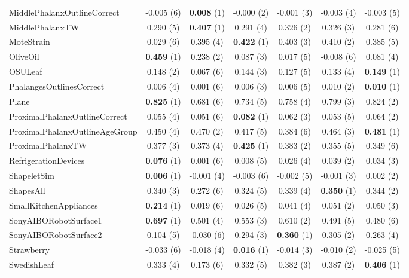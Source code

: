 \begin{table}[ht]
\begin{adjustbox}{width=\textwidth}
\begin{tabular}{lcccccc}
    MiddlePhalanxOutlineCorrect & -0.005 (6) & \textbf{0.008} (1) & -0.000 (2) & -0.001 (3) & -0.003 (4) & -0.003 (5) \\
    MiddlePhalanxTW & 0.290 (5) & \textbf{0.407} (1) & 0.291 (4) & 0.326 (2) & 0.326 (3) & 0.281 (6) \\
    MoteStrain & 0.029 (6) & 0.395 (4) & \textbf{0.422} (1) & 0.403 (3) & 0.410 (2) & 0.385 (5) \\
    OliveOil & \textbf{0.459} (1) & 0.238 (2) & 0.087 (3) & 0.017 (5) & -0.008 (6) & 0.081 (4) \\
    OSULeaf & 0.148 (2) & 0.067 (6) & 0.144 (3) & 0.127 (5) & 0.133 (4) & \textbf{0.149} (1) \\
    PhalangesOutlinesCorrect & 0.006 (4) & 0.001 (6) & 0.006 (3) & 0.006 (5) & 0.010 (2) & \textbf{0.010} (1) \\
    Plane & \textbf{0.825} (1) & 0.681 (6) & 0.734 (5) & 0.758 (4) & 0.799 (3) & 0.824 (2) \\
    ProximalPhalanxOutlineCorrect & 0.055 (4) & 0.051 (6) & \textbf{0.082} (1) & 0.062 (3) & 0.053 (5) & 0.064 (2) \\
    ProximalPhalanxOutlineAgeGroup & 0.450 (4) & 0.470 (2) & 0.417 (5) & 0.384 (6) & 0.464 (3) & \textbf{0.481} (1) \\
    ProximalPhalanxTW & 0.377 (3) & 0.373 (4) & \textbf{0.425} (1) & 0.383 (2) & 0.355 (5) & 0.349 (6) \\
    RefrigerationDevices & \textbf{0.076} (1) & 0.001 (6) & 0.008 (5) & 0.026 (4) & 0.039 (2) & 0.034 (3) \\
    ShapeletSim & \textbf{0.006} (1) & -0.001 (4) & -0.003 (6) & -0.002 (5) & -0.001 (3) & 0.002 (2) \\
    ShapesAll & 0.340 (3) & 0.272 (6) & 0.324 (5) & 0.339 (4) & \textbf{0.350} (1) & 0.344 (2) \\
    SmallKitchenAppliances & \textbf{0.214} (1) & 0.019 (6) & 0.026 (5) & 0.041 (4) & 0.051 (2) & 0.050 (3) \\
    SonyAIBORobotSurface1 & \textbf{0.697} (1) & 0.501 (4) & 0.553 (3) & 0.610 (2) & 0.491 (5) & 0.480 (6) \\
    SonyAIBORobotSurface2 & 0.104 (5) & -0.030 (6) & 0.294 (3) & \textbf{0.360} (1) & 0.305 (2) & 0.263 (4) \\
    Strawberry & -0.033 (6) & -0.018 (4) & \textbf{0.016} (1) & -0.014 (3) & -0.010 (2) & -0.025 (5) \\
    SwedishLeaf & 0.333 (4) & 0.173 (6) & 0.332 (5) & 0.382 (3) & 0.387 (2) & \textbf{0.406} (1) \\

\end{tabular}
\end{adjustbox}
\end{table}
